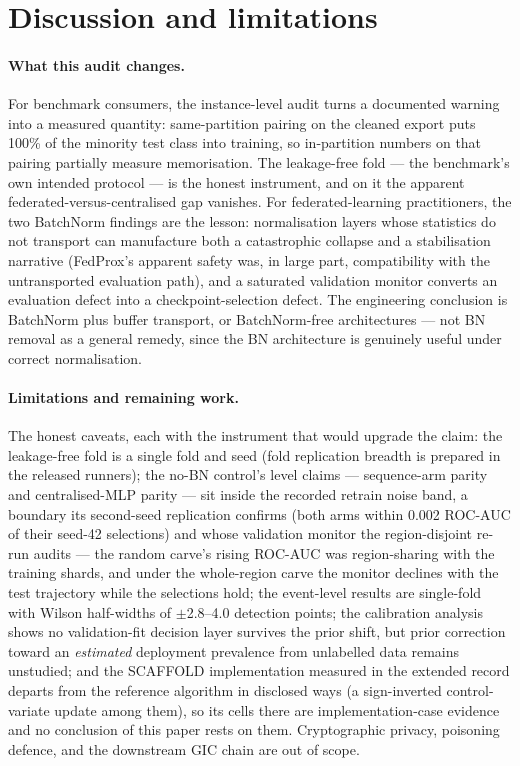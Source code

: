 \section{Discussion and limitations}\label{sec:discussion}

\paragraph{What this audit changes.}
For benchmark consumers, the instance-level audit turns a documented
warning~\cite{angryk2019,eskandari2024} into a measured quantity:
same-partition pairing on the cleaned export puts 100\% of the
minority test class into training, so in-partition numbers on that
pairing partially measure memorisation. The leakage-free fold --- the
benchmark's own intended protocol --- is the honest instrument, and
on it the apparent federated-versus-centralised gap vanishes. For
federated-learning practitioners, the two BatchNorm findings are the
lesson: normalisation layers whose statistics do not transport can
manufacture both a catastrophic collapse and a stabilisation
narrative (FedProx's apparent safety was, in large part, compatibility
with the untransported evaluation path), and a saturated validation
monitor converts an evaluation defect into a checkpoint-selection
defect. The engineering conclusion is BatchNorm plus buffer
transport, or BatchNorm-free architectures --- not BN removal as a
general remedy, since the BN architecture is genuinely useful under
correct normalisation.

\paragraph{Limitations and remaining work.}
The honest caveats, each with the instrument that would upgrade the
claim: the leakage-free fold is a single fold and seed (fold
replication breadth is prepared in the released runners); the no-BN
control's level claims --- sequence-arm parity and
centralised-MLP parity --- sit inside the recorded retrain noise
band, a boundary its second-seed replication confirms (both arms
within 0.002 ROC-AUC of their seed-42 selections) and whose
validation monitor the region-disjoint re-run audits --- the random
carve's rising ROC-AUC was region-sharing with the training
shards, and under the whole-region carve the monitor declines with
the test trajectory while the selections hold; the
event-level results are single-fold with Wilson half-widths of
$\pm$2.8--4.0 detection points; the calibration analysis shows no
validation-fit decision layer survives the prior shift, but
prior correction toward an \emph{estimated} deployment prevalence
from unlabelled data remains unstudied; and the SCAFFOLD
implementation measured in the extended record departs from the
reference algorithm in disclosed ways (a sign-inverted
control-variate update among them), so its cells there are
implementation-case evidence and no conclusion of this paper rests
on them. Cryptographic privacy, poisoning defence, and the
downstream GIC chain are out of scope.


